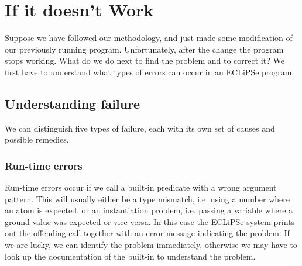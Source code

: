 \documentclass[a4paper,12pt]{report}
\begin{document}

\chapter{If it doesn't Work}
\label{ifitdoesntwork}

Suppose we have followed our methodology, and just made some modification of our previously running program. Unfortunately, after the change the program stops working. What do we do next to find the problem and to correct it? We first have to understand what types of errors can occur in an ECLiPSe program.

\section{Understanding failure}
We can distinguish five types of failure, each with its own set of causes and possible remedies.

\subsection{Run-time errors} 
Run-time errors occur if we call a built-in predicate with a wrong argument pattern. This will usually either be a type mismatch, i.e. using a number where an atom is expected, or an instantiation problem, i.e. passing a variable where a ground value was expected or vice versa. In this case the ECLiPSe system prints out the offending call together with an error message indicating the problem. If we are lucky, we can identify the problem immediately, otherwise we may have to look up the documentation of the built-in to understand the problem.
\end{document}
